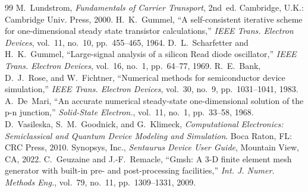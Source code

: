 \documentclass[conference]{IEEEtran}
\begin{document}
\begin{thebibliography}{99}
 M.~Lundstrom, \emph{Fundamentals of Carrier Transport}, 2nd~ed.
Cambridge, U.K.: Cambridge Univ. Press, 2000.
 H.~K.~Gummel, ``A self-consistent iterative scheme for
one-dimensional steady state transistor calculations,'' \emph{IEEE Trans. Electron
Devices}, vol.~11, no.~10, pp.~455--465, 1964.
 D.~L.~Scharfetter and H.~K.~Gummel, ``Large-signal analysis
of a silicon Read diode oscillator,'' \emph{IEEE Trans. Electron Devices}, vol.~16,
no.~1, pp.~64--77, 1969.
 R.~E.~Bank, D.~J.~Rose, and W.~Fichtner, ``Numerical methods for
semiconductor device simulation,'' \emph{IEEE Trans. Electron Devices}, vol.~30,
no.~9, pp.~1031--1041, 1983.
 A.~De~Mari, ``An accurate numerical steady-state one-dimensional
solution of the p-n junction,'' \emph{Solid-State Electron.}, vol.~11, no.~1,
pp.~33--58, 1968.
 D.~Vasileska, S.~M.~Goodnick, and G.~Klimeck, \emph{Computational
Electronics: Semiclassical and Quantum Device Modeling and Simulation}. Boca Raton,
FL: CRC Press, 2010.
 Synopsys, Inc., \emph{Sentaurus Device User Guide}, Mountain
View, CA, 2022.
 C.~Geuzaine and J.-F.~Remacle, ``Gmsh: A 3-D finite element mesh
generator with built-in pre- and post-processing facilities,'' \emph{Int. J.
Numer. Methods Eng.}, vol.~79, no.~11, pp.~1309--1331, 2009.
\end{thebibliography}
\end{document}
